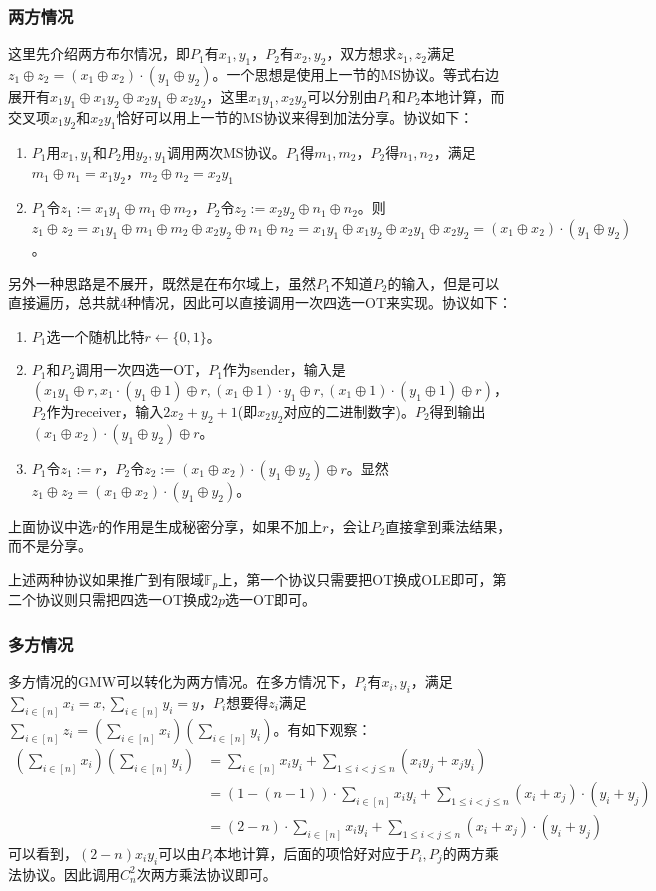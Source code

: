 \documentclass[UTF8]{ctexart}
\theoremstyle{nonumberplain}
\theoremstyle{plain}
\begin{document}
\subsubsection{两方情况}
这里先介绍两方布尔情况，即$P_1$有$x_1,y_1$，$P_2$有$x_2,y_2$，双方想求$z_1,z_2$满足$z_1\oplus z_2 = (x_1\oplus x_2)\cdot(y_1\oplus y_2)$。一个思想是使用上一节的MS协议。等式右边展开有$x_1y_1\oplus x_1y_2\oplus x_2y_1\oplus x_2y_2$，这里$x_1y_1,x_2y_2$可以分别由$P_1$和$P_2$本地计算，而交叉项$x_1y_2$和$x_2y_1$恰好可以用上一节的MS协议来得到加法分享。协议如下：
\begin{enumerate}
\item $P_1$用$x_1,y_1$和$P_2$用$y_2,y_1$调用两次MS协议。$P_1$得$m_1,m_2$，$P_2$得$n_1,n_2$，满足$m_1\oplus n_1=x_1y_2$，$m_2\oplus n_2 =x_2y_1 $
\item $P_1$令$z_1:=x_1y_1\oplus m_1\oplus m_2$，$P_2$令$z_2:=x_2y_2\oplus n_1\oplus n_2$。则$z_1\oplus z_2 = x_1y_1\oplus m_1\oplus m_2\oplus x_2y_2\oplus n_1\oplus n_2 = x_1y_1\oplus x_1y_2\oplus x_2y_1\oplus x_2y_2=(x_1\oplus x_2)\cdot(y_1\oplus y_2)$。
\end{enumerate}


另外一种思路是不展开，既然是在布尔域上，虽然$P_1$不知道$P_2$的输入，但是可以直接遍历，总共就4种情况，因此可以直接调用一次四选一OT来实现。协议如下：
\begin{enumerate}
\item $P_1$选一个随机比特$r\leftarrow \{0,1\}$。
\item $P_1$和$P_2$调用一次四选一OT，$P_1$作为sender，输入是$(x_1y_1\oplus r,x_1\cdot(y_1\oplus1)\oplus r,(x_1\oplus 1)\cdot y_1\oplus r,(x_1\oplus 1)\cdot(y_1\oplus 1)\oplus r)$，$P_2$作为receiver，输入$2x_2+ y_2+1$(即$x_2y_2$对应的二进制数字)。$P_2$得到输出$(x_1\oplus x_2)\cdot(y_1\oplus y_2)\oplus r$。
\item $P_1$令$z_1:=r$，$P_2$令$z_2:=(x_1\oplus x_2)\cdot(y_1\oplus y_2)\oplus r$。显然$z_1\oplus z_2 = (x_1\oplus x_2)\cdot(y_1\oplus y_2)$。
\end{enumerate}

上面协议中选$r$的作用是生成秘密分享，如果不加上$r$，会让$P_2$直接拿到乘法结果，而不是分享。

上述两种协议如果推广到有限域$\mathbb{F}_p$上，第一个协议只需要把OT换成OLE即可，第二个协议则只需把四选一OT换成$2p$选一OT即可。
\subsubsection{多方情况}
多方情况的GMW可以转化为两方情况。在多方情况下，$P_i$有$x_i,y_i$，满足$\sum_{i\in [n]}x_i = x,\sum_{i\in [n]}y_i=y$，$P_i$想要得$z_i$满足$\sum_{i\in [n]}z_i=(\sum_{i\in [n]}x_i)(\sum_{i\in [n]}y_i)$。有如下观察：
\begin{align*}
(\sum_{i\in [n]}x_i)(\sum_{i\in [n]}y_i)&=\sum_{i\in[n]}x_iy_i+\sum_{1\leq i<j\leq n}(x_iy_j+x_jy_i)\\
&=(1-(n-1))\cdot\sum_{i\in[n]}x_iy_i+\sum_{1\leq i<j\leq n}(x_i+x_j)\cdot(y_i+y_j)\\
&=(2-n)\cdot\sum_{i\in[n]}x_iy_i+\sum_{1\leq i<j\leq n}(x_i+x_j)\cdot(y_i+y_j)
\end{align*}
可以看到，$(2-n)x_iy_i$可以由$P_i$本地计算，后面的项恰好对应于$P_i,P_j$的两方乘法协议。因此调用$C_n^2$次两方乘法协议即可。
\end{document}
